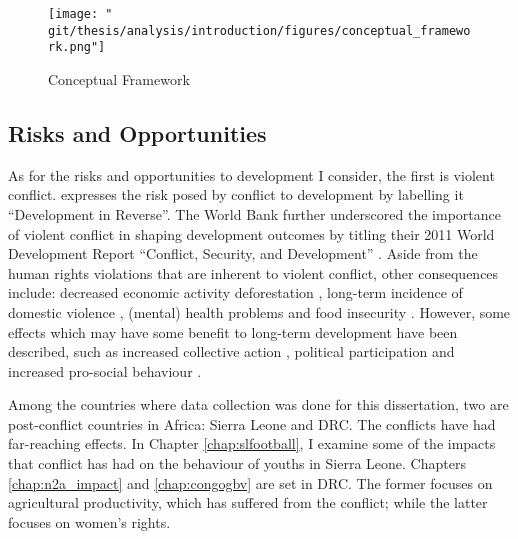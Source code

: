 \begin{figure}[htb]
  \centering
  \texttt{[image: "\\git/thesis/analysis/introduction/figures/conceptual\_framework.png"]}
  \caption{Conceptual Framework}
  \label{intro:fig:framework}
\end{figure}

\subsection{Risks and Opportunities}
As for the risks and opportunities to development I consider, the first is violent conflict. \citet{Collier2003}  expresses the risk posed by conflict to development by labelling it ``Development in Reverse''. The World Bank further underscored the importance of violent conflict in shaping development outcomes by titling their 2011 World Development Report ``Conflict, Security, and Development'' \citep{WorldBank2011}. Aside from the human rights violations that are inherent to violent conflict, other consequences include: decreased economic activity \citep{Collier1999} deforestation \cite[e.g.][]{Connectiona}, long-term incidence of domestic violence \citep[e.g.][]{LaMattina2017, Muller2019}, (mental) health problems \cite[e.g.][]{Smith2002, Iqbal2006a,Akresh2011} and food insecurity \cite[e.g.][]{Lecoutere2005, Verwimp2012}. However, some effects which may have some benefit to long-term development have been described, such as increased collective action \citep{Bellows2009b}, political participation \citep{Blattman2009a} and increased pro-social behaviour \citep{Voors2012a}.

Among the countries where data collection was done for this dissertation, two are post-conflict countries in Africa: Sierra Leone and DRC. The conflicts have had far-reaching effects. In Chapter \ref{chap:slfootball}, I examine some of the impacts that conflict has had on the behaviour of youths in Sierra Leone. Chapters \ref{chap:n2a_impact} and \ref{chap:congogbv} are set in DRC. The former focuses on agricultural productivity, which has suffered from the conflict; while the latter focuses on women's rights. %

